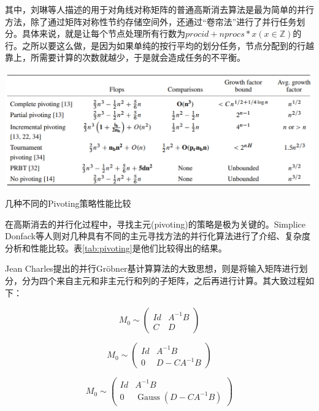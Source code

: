 \documentclass[a4paper]{article}
\begin{document}
其中，刘琳等人描述的用于对角线对称矩阵的普通高斯消去算法是最为简单的并行方法，除了通过矩阵对称性节约存储空间外，还通过“卷帘法”进行了并行任务划分。具体来说，就是让每个节点处理所有行数为$procid+nprocs*x (x \in \mathbb{Z})$的行。之所以要这么做，是因为如果单纯的按行平均的划分任务，节点分配到的行越靠上，所需要计算的次数就越少，于是就会造成任务的不平衡。

\begin{table}[!htbp]
    \centering
    \includegraphics[width=6in]{fig/pivoting.png}
    \caption{几种不同的Pivoting策略性能比较}
    \label{tab:pivoting}
\end{table}

在高斯消去的并行化过程中，寻找主元(pivoting)的策略是极为关键的。Simplice Donfack等人则对几种具有不同的主元寻找方法的并行化算法进行了介绍、复杂度分析和性能比较。表\ref{tab:pivoting}是他们比较得出的结果。

Jean Charles提出的并行Gröbner基计算算法的大致思想，则是将输入矩阵进行划分，分为四个来自主元和非主元行和列的子矩阵，之后再进行计算。其大致过程如下：\cite{faugere2010parallel}

\begin{equation}
    M_{0} \sim\left(\begin{array}{c|c}
I d & A^{-1} B \\
\hline C & D
\end{array}\right)
\end{equation}

\begin{equation}
M_{0} \sim\left(\begin{array}{c|c}
I d & A^{-1} B \\
\hline 0 & D-C A^{-1} B
\end{array}\right)
\end{equation}

\begin{equation}
M_{0} \sim\left(\begin{array}{c|c}
I d & A^{-1} B \\
\hline 0 & \operatorname{Gauss}\left(D-C A^{-1} B\right)
\end{array}\right)
\end{equation}
\end{document}
